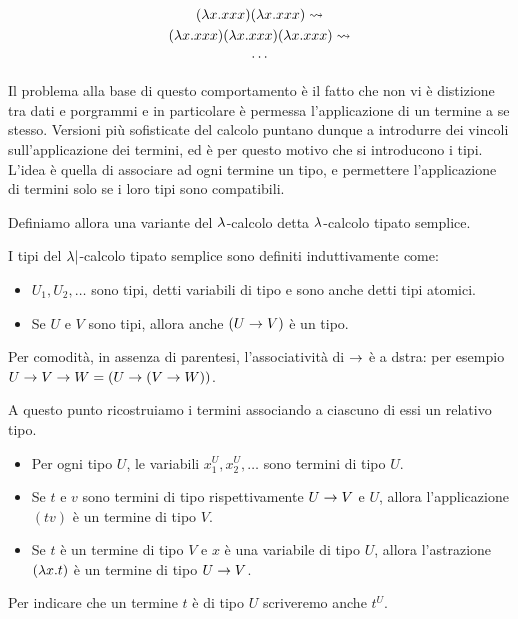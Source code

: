 \documentclass[]{marticle}
\begin{document}
\begin{block}[Esempio]
    \begin{gather*}
        (\lambda x. xxx)(\lambda x. xxx) \rightsquigarrow \\
        (\lambda x. xxx)(\lambda x. xxx)(\lambda x. xxx)\rightsquigarrow \\
        \cdots
    \end{gather*}
\end{block} 

Il problema alla base di questo comportamento \`e il fatto che non vi \`e
distizione tra dati e porgrammi e in particolare \`e permessa l'applicazione di
un termine a se stesso. Versioni pi\`u sofisticate del calcolo puntano dunque a
introdurre dei vincoli sull'applicazione dei termini, ed \`e per questo motivo
che si introducono i tipi. L'idea \`e quella di associare ad ogni termine un
tipo, e permettere l'applicazione di termini solo se i loro tipi sono
compatibili.

Definiamo allora una variante del $\lambda$-calcolo detta $\lambda$-calcolo tipato
semplice.

\begin{block}[Definizione]
    I tipi del $\lambda|$-calcolo tipato semplice sono definiti induttivamente come:
    \begin{itemize}
        \item $U_1, U_2, \dots$ sono tipi, detti variabili di tipo e sono anche
            detti tipi atomici.
        \item Se $U$ e $V$ sono tipi, allora anche $(U\rightarrow V)$ \`e un tipo.
    \end{itemize}
    Per comodit\`a, in assenza di parentesi, l'associativit\`a di $\rightarrow$ \`e a
    dstra: per esempio $U\rightarrow V\rightarrow W = (U\rightarrow(V\rightarrow W))$.

    A questo punto ricostruiamo i termini associando a ciascuno di essi un
    relativo tipo.
    \begin{itemize}
        \item Per ogni tipo $U$, le variabili $x^U_1, x^U_2, \dots$ sono termini
            di tipo $U$.
        \item Se $t$ e $v$ sono termini di tipo rispettivamente $U\rightarrow V$ e $U$,
            allora l'applicazione $(tv)$ \`e un termine di tipo $V$.
        \item Se $t$ \`e un termine di tipo $V$ e $x$ \`e una variabile di tipo
            $U$, allora l'astrazione $(\lambda x.  t)$ \`e un termine di tipo $U\rightarrow
            V$.
    \end{itemize}

    Per indicare che un termine $t$ \`e di tipo $U$ scriveremo anche $t^U$.
\end{block}
\end{document}
